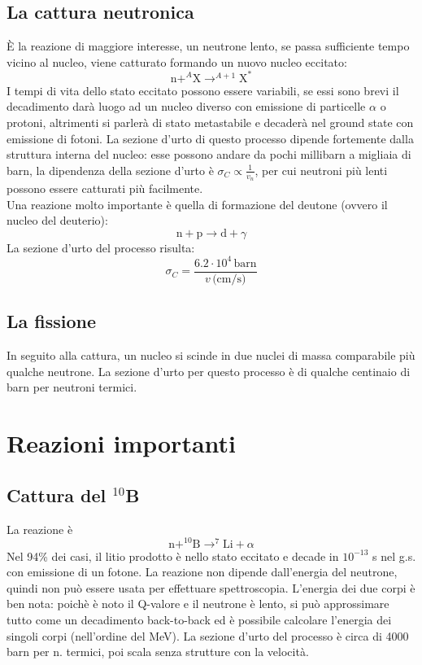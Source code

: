 \subsection{La cattura neutronica}
\`E la reazione di maggiore interesse, un neutrone lento, se passa sufficiente tempo vicino al nucleo, viene catturato formando un nuovo nucleo eccitato:
\begin{equation*}
\text{n} + ^A\text{X} \to ^{A+1}\text{X}^*
\end{equation*}
I tempi di vita dello stato eccitato possono essere variabili, se essi sono brevi il decadimento dar\`a luogo ad un nucleo diverso con emissione di particelle
$\alpha$ o protoni, altrimenti si parler\`a di stato metastabile e decader\`a nel ground state con emissione di fotoni.
La sezione d'urto di questo processo dipende fortemente dalla struttura interna del nucleo: esse possono andare da pochi millibarn a migliaia di barn,
la dipendenza della sezione d'urto \`e $\sigma_C \propto \frac{1}{v_n}$, per cui neutroni pi\`u lenti possono essere catturati pi\`u facilmente.\\
Una reazione molto importante \`e quella di formazione del deutone (ovvero il nucleo del deuterio):
\begin{equation*}
\text{n}+\text{p} \to \text{d} + \gamma
\end{equation*}
La sezione d'urto del processo risulta:
\begin{equation*}
\sigma_C = \frac{6.2 \cdot 10^4 \, \text{barn}}{v \, \text{(cm/s)}}
\end{equation*}
\subsection{La fissione}
In seguito alla cattura, un nucleo si scinde in due nuclei di massa comparabile pi\`u qualche neutrone.
La sezione d'urto per questo processo \`e di qualche centinaio di barn per neutroni termici.
\section{Reazioni importanti}
\subsection{Cattura del $^{10}$B}
La reazione \`e
\begin{equation*}
\text{n} + ^{10}\text{B} \to ^7\text{Li} + \alpha
\end{equation*}
Nel 94\% dei casi, il litio prodotto \`e nello stato eccitato e decade in $10^{-13}$ s nel g.s. con emissione di un fotone.
La reazione non dipende dall'energia del neutrone, quindi non pu\`o essere usata per effettuare spettroscopia.
L'energia dei due corpi \`e ben nota: poich\`e \`e noto il Q-valore e il neutrone \`e lento, si pu\`o approssimare tutto come un decadimento back-to-back
ed \`e possibile calcolare l'energia dei singoli corpi (nell'ordine del MeV).
La sezione d'urto del processo \`e circa di 4000 barn per n. termici, poi scala senza strutture con la velocit\`a.
